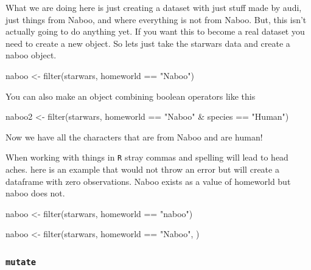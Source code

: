 \documentclass[]{tufte-handout}
\newenvironment{Shaded}{}{}
\newcommand{\FunctionTok}[1]{\textcolor[rgb]{0.02,0.16,0.49}{#1}}
\newcommand{\NormalTok}[1]{#1}
\newcommand{\OtherTok}[1]{\textcolor[rgb]{0.00,0.44,0.13}{#1}}
\newcommand{\SpecialCharTok}[1]{\textcolor[rgb]{0.25,0.44,0.63}{#1}}
\newcommand{\StringTok}[1]{\textcolor[rgb]{0.25,0.44,0.63}{#1}}
\begin{document}
What we are doing here is just creating a dataset with just stuff made
by audi, just things from Naboo, and where everything is not from Naboo.
But, this isn't actually going to do anything yet. If you want this to
become a real dataset you need to create a new object. So lets just take
the starwars data and create a naboo object.

\begin{Shaded}
\begin{Highlighting}[]
\NormalTok{naboo }\OtherTok{\textless{}{-}} \FunctionTok{filter}\NormalTok{(starwars, homeworld }\SpecialCharTok{==} \StringTok{"Naboo"}\NormalTok{)}
\end{Highlighting}
\end{Shaded}

You can also make an object combining boolean operators like this

\begin{Shaded}
\begin{Highlighting}[]
\NormalTok{naboo2 }\OtherTok{\textless{}{-}} \FunctionTok{filter}\NormalTok{(starwars, homeworld }\SpecialCharTok{==} \StringTok{"Naboo"} \SpecialCharTok{\&}\NormalTok{ species }\SpecialCharTok{==} \StringTok{"Human"}\NormalTok{)}
\end{Highlighting}
\end{Shaded}

Now we have all the characters that are from Naboo and are human!

When working with things in \texttt{R} stray commas and spelling will
lead to head aches. here is an example that would not throw an error but
will create a dataframe with zero observations. Naboo exists as a value
of homeworld but naboo does not.

\begin{Shaded}
\begin{Highlighting}[]
\NormalTok{naboo }\OtherTok{\textless{}{-}} \FunctionTok{filter}\NormalTok{(starwars, homeworld }\SpecialCharTok{==} \StringTok{"naboo"}\NormalTok{)}

\NormalTok{naboo }\OtherTok{\textless{}{-}} \FunctionTok{filter}\NormalTok{(starwars, homeworld }\SpecialCharTok{==} \StringTok{"Naboo"}\NormalTok{, )}
\end{Highlighting}
\end{Shaded}

\hypertarget{mutate}{%
\subsubsection{\texorpdfstring{\texttt{mutate}}{mutate}}\label{mutate}}
\end{document}
